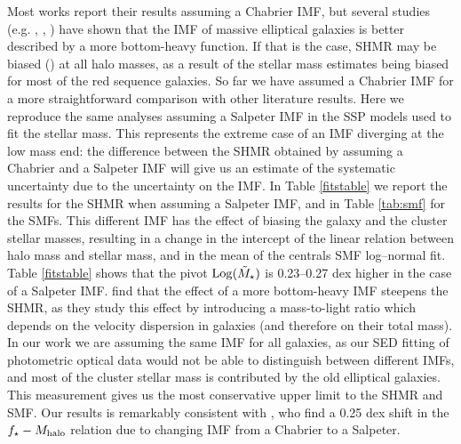{Most works report their results assuming a Chabrier IMF, but several studies (e.g. \citealt{imf13}, \citealt{imf151}, \citealt{imf15}) have shown that the IMF of massive elliptical galaxies is better described by a more bottom-heavy function. If that is the case, SHMR may be biased (\citealt{kravtsov}) at all halo masses, as a result of the stellar mass estimates being biased for most of the red sequence galaxies. So far we have assumed a Chabrier IMF for a more straightforward comparison with other literature results. Here we reproduce the same analyses assuming a Salpeter IMF in the SSP models used to fit the stellar mass. This represents the extreme case of an IMF diverging at the low mass end: the difference between the SHMR obtained by assuming a Chabrier and a Salpeter IMF will give us an estimate of the systematic uncertainty due to the uncertainty on the IMF. In Table \ref{fitstable} we report the results for the SHMR when assuming a Salpeter IMF, and in Table \ref{tab:smf} for the SMFs. This different IMF has the effect of biasing the galaxy and the cluster stellar masses, resulting in a change in the intercept of the linear relation between halo mass and stellar mass, and in the mean of the centrals SMF log--normal fit. Table \ref{fitstable} shows that the pivot ${\rm Log}(\tilde{M}_\star)$ is 0.23--0.27 dex higher in the case of a Salpeter IMF.
\citet{kravtsov} find that the effect of a more bottom-heavy IMF steepens the SHMR, as they study this effect by introducing a mass-to-light ratio which depends on the velocity dispersion in galaxies (and therefore on their total mass). In our work we are assuming the same IMF for all galaxies, as our SED fitting of photometric optical data would not be able to distinguish between different IMFs, and most of the cluster stellar mass is contributed by the old elliptical galaxies. This measurement gives us the most conservative upper limit to the SHMR and SMF. Our results is remarkably consistent with \citet{2012ApJ...746...95L}, who find a 0.25 dex shift in the $f_\star-M_{\rm halo}$ relation due to changing IMF from a Chabrier to a Salpeter.




}
